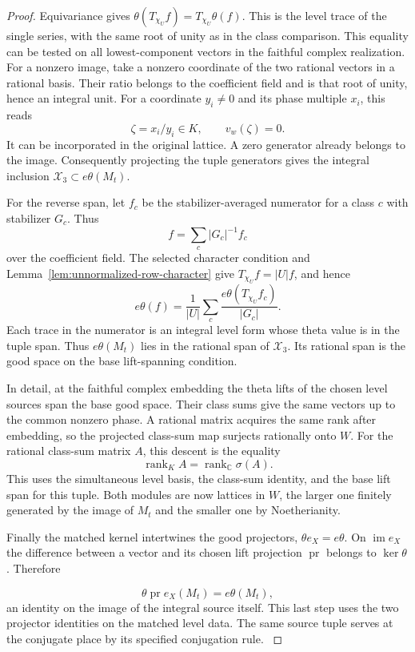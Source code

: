 \begin{proof}
Equivariance gives \(\theta(T_{\chi_U}f)=T_{\chi_U}\theta(f)\).
This is the level trace of the single series, with the same
root of unity as in the class comparison. This equality can be tested on
all lowest-component vectors in the faithful complex realization.
For a nonzero image, take a nonzero coordinate of the two
rational vectors in a rational basis. Their ratio belongs
to the coefficient field and is that root of unity, hence
an integral unit.
For a coordinate \(y_i\ne0\) and its phase multiple \(x_i\), this reads
\[
  \zeta=x_i/y_i\in K,\qquad v_w(\zeta)=0 .
\]
 It can be incorporated in the original
lattice. A zero generator already belongs to the image.
Consequently projecting the tuple generators gives the
integral inclusion \(\mathcal X_3\subset e\theta(M_t)\).
\label{cor:paired-twist-index-4}

For the reverse span, let \(f_c\) be the
stabilizer-averaged numerator for a class \(c\) with stabilizer
\(G_c\). Thus 
\[
  f=\sum_c |G_c|^{-1}f_c
\]
 over the coefficient
field. The selected character condition and Lemma~\ref{lem:unnormalized-row-character} give \(T_{\chi_U}f=|U|f\), and hence
\[
 e\theta(f)
   =\frac1{|U|}\sum_c\frac{e\theta(T_{\chi_U}f_c)}{|G_c|}.
\]
Each trace in the numerator is an integral level form whose
theta value is in the tuple span. Thus \(e\theta(M_t)\) lies in the rational span of
\(\mathcal X_3\). Its rational span is the good space on the
base lift-spanning condition.

In detail, at the faithful
complex embedding the theta lifts of the chosen level
sources span the base good space. Their class sums give the same vectors up to the common nonzero phase.
A rational matrix acquires the same rank after embedding,
so the projected class-sum map surjects rationally onto
\(W\).
For the rational class-sum matrix \(A\), this descent is the equality
\[
  \operatorname{rank}_K A=\operatorname{rank}_{\mathbb C}\sigma(A).
\]
 This uses the simultaneous level basis, the class-sum
identity, and the base lift span for this tuple. Both modules
are now lattices in \(W\), the larger one finitely generated
by the image of \(M_t\) and the smaller one by Noetherianity.

Finally the matched kernel intertwines the good projectors,
\(\theta e_X=e\theta\). On \(\operatorname{im}e_X\) the
difference between a vector and its chosen lift projection
\(\operatorname{pr}\) belongs to \(\ker\theta\). Therefore

\[
  \theta\operatorname{pr} e_X(M_t)=e\theta(M_t),
\]
 an
identity on the image of the integral source itself. This
last step uses the two projector identities on the matched
level data. The same source tuple serves at the conjugate
place by its specified conjugation rule.
\label{cor:paired-twist-index-5}
\end{proof}
